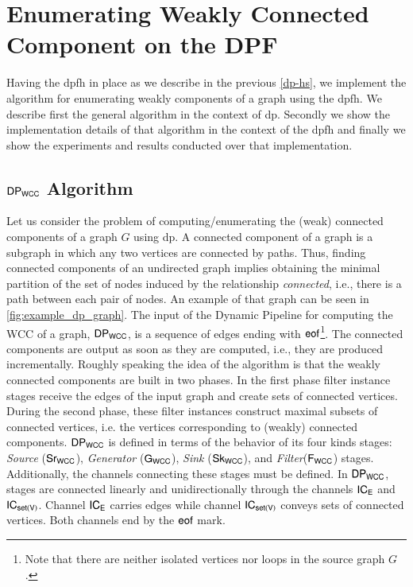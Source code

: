 \section{Enumerating Weakly Connected Component on the DPF}\label{sec:wcc-dpf}

Having the \acrshort{dpfh} in place as we describe in the previous \autoref{dp-hs}, we implement the algorithm for enumerating weakly components of a graph using the \acrshort{dpfh}.
We describe first the general algorithm in the context of \acrshort{dp}. Secondly we show the implementation details of that algorithm in the context of the \acrshort{dpfh} and finally we
show the experiments and results conducted over that implementation.

\subsection{$\mathsf{DP_{WCC}}$ Algorithm}
  Let us consider the problem of computing/enumerating the (weak) connected components of a graph $G$ using \acrshort{dp}. 
  A connected component of a graph is a subgraph in which any two vertices are connected by paths.  
  Thus, finding connected components of an undirected graph implies obtaining the minimal partition of the set of nodes induced by the relationship \textit{connected}, i.e., there is a path between each pair of nodes. An example of that graph can be seen in \autoref{fig:example_dp_graph}.
  The input of the Dynamic Pipeline for computing the WCC of a graph, $\mathsf{DP_{WCC}}$, is a sequence of edges ending with $\mathsf{eof}$\footnote{Note that there are neither isolated vertices nor loops in the source graph $G$.}. The connected components are output as soon as they are computed, i.e., they are produced incrementally. 
  Roughly speaking the idea of the algorithm is that the weakly connected components are built in two phases. In the first phase filter instance stages receive the edges of the input graph and create sets of connected vertices. 
  During the second phase, these filter instances construct maximal subsets of connected vertices, i.e. the vertices corresponding to (weakly) connected components.
  $\mathsf{DP_{WCC}}$ is defined in terms of the behavior of its four kinds stages: \textit{Source} ($\mathsf{Sr_{WCC}}$),  \textit{Generator} ($\mathsf{G_{WCC}}$),  \textit{Sink} ($\mathsf{Sk_{WCC}}$), and \textit{Filter}($\mathsf{F_{WCC}}$) stages. Additionally,  the channels connecting these stages must be defined. 
  In $\mathsf{DP_{WCC}}$, stages are connected linearly and unidirectionally through the channels $\mathsf{IC_E}$ and  $\mathsf{IC_{set(V)}}$. Channel $\mathsf{IC_E}$ carries edges while channel  $\mathsf{IC_{set(V)}}$ conveys sets of connected vertices. Both channels end by the $\mathsf{eof}$ mark. 
